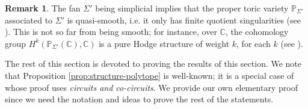 \documentclass[11pt, reqno]{amsart}
\theoremstyle{plain}
\theoremstyle{definition}
\newtheorem{rem}[theo]{Remark}
\newcommand{\Ps}{\mathbb{P}}
\newcommand{\C}{\mathbb{C}}
\begin{document}
\begin{rem}
  The fan $\Sigma'$ being simplicial implies that the proper toric variety  $\Ps_{\Sigma'}$ associated to $\Sigma'$ is quasi-smooth, i.e. it only has finite quotient singularities (see \cite{batyrev-cox}). 
  This is not so far from being smooth; for instance, over $\C$, the cohomology group $H^k(\Ps_{\Sigma'}(\C),\C)$ is a pure Hodge structure of weight $k$, for each $k$ (see \cite{steenbrink-vanishing}). 
\end{rem}

The rest of this section is devoted to proving the results of this section.
We note that Proposition \ref{prop:structure-polytope} is well-known; it is a special case of \cite[Lemma 4.1.38 (iii)]{triangulations-book} whose proof uses \emph{circuits and co-circuits}. We provide our own elementary proof since we need the notation and ideas to prove the rest of the statements. 
\end{document}
